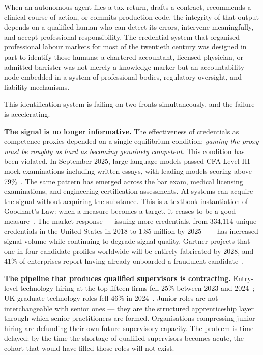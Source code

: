 \documentclass[11pt,a4paper]{article}
\begin{document}
When an autonomous agent files a tax return, drafts a contract, recommends a clinical course of
action, or commits production code, the integrity of that output depends on a qualified human who
can detect its errors, intervene meaningfully, and accept professional responsibility. The
credential system that organised professional labour markets for most of the twentieth century was
designed in part to identify those humans: a chartered accountant, licensed physician, or admitted
barrister was not merely a knowledge marker but an accountability node embedded in a system of
professional bodies, regulatory oversight, and liability mechanisms.

This identification system is failing on two fronts simultaneously, and the failure is
accelerating.

\textbf{The signal is no longer informative.} The effectiveness of credentials as competence proxies
depended on a single equilibrium condition: \emph{gaming the proxy must be roughly as hard as
becoming genuinely competent}. This condition has been violated. In September 2025, large language
models passed CFA Level III mock examinations including written essays, with leading models scoring
above 79\%~\cite{nyustern2025}. The same pattern has emerged across the bar exam, medical licensing
examinations, and engineering certification assessments. AI systems can acquire the signal without
acquiring the substance. This is a textbook instantiation of Goodhart's Law: when a measure becomes
a target, it ceases to be a good measure~\cite{goodhart1975}. The market response — issuing more
credentials, from 334,114 unique credentials in the United States in 2018 to 1.85 million by
2025~\cite{credentialengine2025} — has increased signal volume while continuing to degrade signal
quality. Gartner projects that one in four candidate profiles worldwide will be entirely fabricated
by 2028, and 41\% of enterprises report having already onboarded a fraudulent
candidate~\cite{gartner2025}.

\textbf{The pipeline that produces qualified supervisors is contracting.} Entry-level technology
hiring at the top fifteen firms fell 25\% between 2023 and 2024~\cite{signalfire2024}; UK graduate
technology roles fell 46\% in 2024~\cite{rezi2026}. Junior roles are not interchangeable with senior
ones — they are the structured apprenticeship layer through which senior practitioners are formed.
Organisations compressing junior hiring are defunding their own future supervisory capacity. The
problem is time-delayed: by the time the shortage of qualified supervisors becomes acute, the cohort
that would have filled those roles will not exist.
\end{document}
